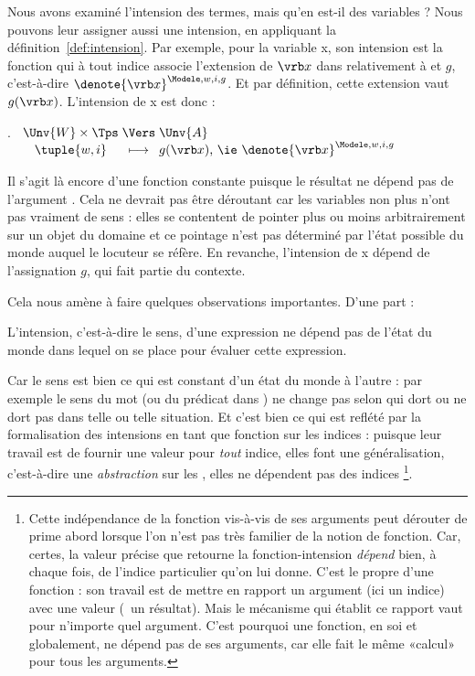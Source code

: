 Nous avons examiné l'intension des termes, mais qu'en est-il des variables ?
Nous pouvons leur assigner aussi une intension, en appliquant la définition~\ref{def:intension}.
Par exemple, pour la variable \vrb x, son intension est la fonction qui à tout indice  associe l'extension de $\vrb x$
dans  relativement à {\Modele} et $g$, c'est-à-dire
\(\denote{\vrb x}^{\Modele,w,i,g}\).  Et par définition, cette extension vaut
$g(\vrb x)$.  L'intension de \vrb x est donc :

\ex.  
\(%
\begin{array}[t]{c@{\;}c@{\;}l}
\Unv{W}\times\Tps &\Vers& \Unv{A}\\
\tuple{w,i} &\longmapsto& g(\vrb x) \text{, \ie\ } \denote{\vrb x}^{\Modele,w,i,g}
  \end{array}\)\label{intvar}

Il s'agit là encore d'une fonction constante puisque le résultat ne
dépend pas de l'argument .  Cela ne devrait pas être déroutant car
les variables non plus n'ont pas vraiment de sens : elles se contentent
de pointer plus ou moins arbitrairement sur un objet du domaine et ce
pointage n'est pas déterminé par l'état possible du monde auquel le locuteur se réfère.  En revanche, l'intension de \vrb x dépend de l'assignation $g$, qui fait partie du contexte.

\newpage

Cela nous amène à faire quelques observations importantes. D'une part :

\begin{point}\label{pt:sensindepi}
{L'intension,
c'est-à-dire le sens, d'une expression ne dépend pas de l'état du monde
dans lequel on se place pour évaluer cette expression.}
\end{point}

Car le sens
est bien ce qui est constant d'un état du monde à l'autre : par exemple le
sens du mot  (ou du prédicat  dans {\LO}) ne
change pas selon qui dort ou ne dort pas dans telle ou telle situation.
Et c'est bien ce qui est reflété par la formalisation des
intensions en tant que fonction sur les indices : puisque leur travail est de fournir une valeur pour \emph{tout} indice, elles font une généralisation, c'est-à-dire une 
\emph{abstraction} sur les , elles ne dépendent pas des indices%
\footnote{Cette indépendance de la fonction vis-à-vis de ses arguments peut dérouter de prime abord lorsque l'on n'est pas très familier de la notion de fonction. Car, certes, la valeur précise que retourne la fonction-intension \emph{dépend} bien, à chaque fois, de l'indice particulier qu'on lui donne. C'est le propre d'une fonction : son travail est de mettre en rapport un argument (ici un indice) avec une valeur (\ie\ un résultat). Mais le mécanisme qui établit ce rapport vaut pour n'importe quel argument. C'est pourquoi une fonction, en soi et globalement, ne dépend pas de ses arguments, car elle fait le même «calcul» pour tous les arguments.}. 

